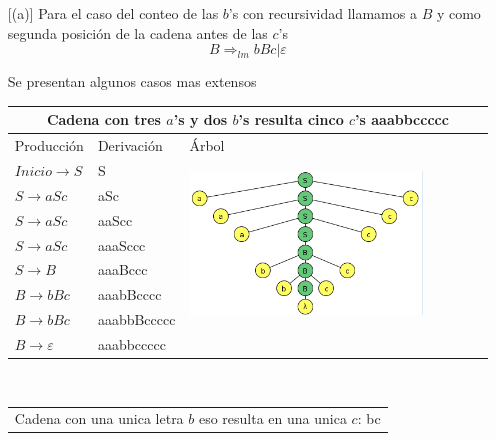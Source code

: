\documentclass{article}
\begin{document}
\begin{enumerate} [(a)]
            Para el caso del conteo de las $b$'s con recursividad llamamos a $B$ y como segunda posición de la cadena antes de las $c$'s
            \[ 
                B \Rightarrow_{lm} bBc | \varepsilon 
            \]
            
            Se presentan algunos casos mas extensos
            
            \begin{tabular}{|p{5cm}|p{5cm}|p{5cm}|  }
            \hline
            \multicolumn{3}{|c|}{Cadena con tres $a$'s y dos $b$'s resulta cinco $c$'s aaabbccccc} \\
            \hline
            Producción & Derivación & Árbol\\
            \hline
            $ Inicio \to S$ & S & \multirow{7}{*}{
            \centering
            \begin{minipage}{.3\textwidth}
            \includegraphics[width=0.8\textwidth]{img/eje_f_caso1.png}
            \end{minipage}
            } \\
             $ S \to aSc$ & aSc & \\
             $ S \to aSc$ & aaScc & \\
             $ S \to aSc$ & aaaSccc & \\
             $ S \to B$ & aaaBccc & \\
             $ B \to bBc$ & aaabBcccc & \\
             $ B \to bBc$ & aaabbBccccc & \\
             $ B \to \varepsilon$ & aaabbccccc & \\
             \hline
            \end{tabular}
            \\
            \begin{tabular}{|p{5cm}|p{5cm}|p{5cm}|  }
            \hline
            \multicolumn{3}{|c|}{Cadena con una unica letra $b$ eso resulta en una unica $c$: bc} \\

\end{tabular}
\end{enumerate}
\end{document}
